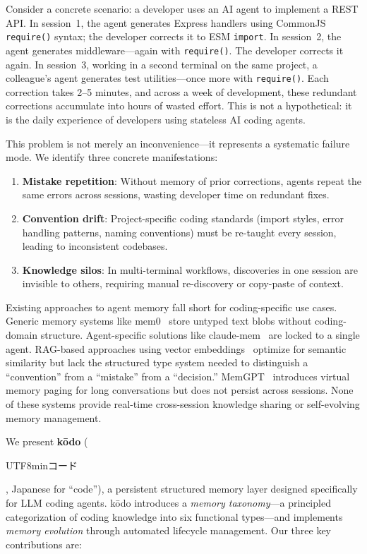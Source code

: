 \documentclass{article}
\begin{document}
Consider a concrete scenario: a developer uses an AI agent to implement a REST API. In session~1, the agent generates Express handlers using CommonJS \texttt{require()} syntax; the developer corrects it to ESM \texttt{import}. In session~2, the agent generates middleware---again with \texttt{require()}. The developer corrects it again. In session~3, working in a second terminal on the same project, a colleague's agent generates test utilities---once more with \texttt{require()}. Each correction takes 2--5 minutes, and across a week of development, these redundant corrections accumulate into hours of wasted effort. This is not a hypothetical: it is the daily experience of developers using stateless AI coding agents.

This problem is not merely an inconvenience---it represents a systematic failure mode. We identify three concrete manifestations:

\begin{enumerate}
    \item \textbf{Mistake repetition}: Without memory of prior corrections, agents repeat the same errors across sessions, wasting developer time on redundant fixes.
    \item \textbf{Convention drift}: Project-specific coding standards (import styles, error handling patterns, naming conventions) must be re-taught every session, leading to inconsistent codebases.
    \item \textbf{Knowledge silos}: In multi-terminal workflows, discoveries in one session are invisible to others, requiring manual re-discovery or copy-paste of context.
\end{enumerate}

Existing approaches to agent memory fall short for coding-specific use cases. Generic memory systems like mem0~\cite{mem0} store untyped text blobs without coding-domain structure. Agent-specific solutions like claude-mem~\cite{claudemem} are locked to a single agent. RAG-based approaches using vector embeddings~\cite{lewis2020rag} optimize for semantic similarity but lack the structured type system needed to distinguish a ``convention'' from a ``mistake'' from a ``decision.'' MemGPT~\cite{packer2023memgpt} introduces virtual memory paging for long conversations but does not persist across sessions. None of these systems provide real-time cross-session knowledge sharing or self-evolving memory management.

We present \textbf{k\=odo} (\begin{CJK}{UTF8}{min}コード\end{CJK}, Japanese for ``code''), a persistent structured memory layer designed specifically for LLM coding agents. k\=odo introduces a \emph{memory taxonomy}---a principled categorization of coding knowledge into six functional types---and implements \emph{memory evolution} through automated lifecycle management. Our three key contributions are:
\end{document}
